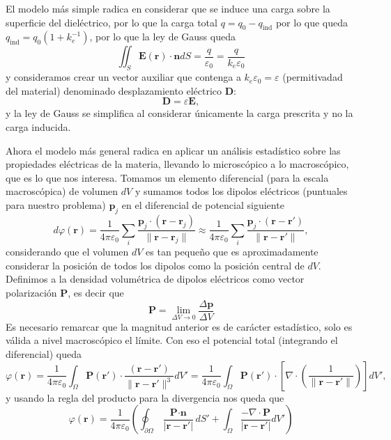 \documentclass[11pt,a4paper]{article}
\numberwithin{equation}{section}
\begin{document}
El modelo más simple radica en considerar que se induce una carga sobre la superficie del dieléctrico, por lo que la carga total $q = q_0 - q_{\text{ind}}$ por lo que queda $q_{\text{ind}} = q_0 (1 + k_{e}^{-1})$, por lo que la ley de Gauss queda \[\iint_{S} \textbf{E}(\textbf{r}) \cdot \textbf{n} dS = \frac{q}{\varepsilon_0} = \frac{q}{k_e \varepsilon_0}\] y consideramos crear un vector auxiliar que contenga a $k_e \varepsilon_0 = \varepsilon$ (permitivadad del material) denominado desplazamiento eléctrico $\textbf{D}$:
\begin{equation}
    \textbf{D} = \varepsilon \textbf{E},
    \label{eq:e_desplazamiento_simple}
\end{equation}
y la ley de Gauss se simplifica al considerar únicamente la carga prescrita y no la carga inducida.

Ahora el modelo más general radica en aplicar un análisis estadístico sobre las propiedades eléctricas de la materia, llevando lo microscópico a lo macroscópico, que es lo que nos interesa. Tomamos un elemento diferencial (para la escala macroscópica) de volumen $dV$ y sumamos todos los dipolos eléctricos (puntuales para nuestro problema) $\textbf{p}_j$ en el diferencial de potencial siguiente \[d\varphi(\textbf{r}) = \frac{1}{4\pi\varepsilon_0}\sum_i \frac{\textbf{p}_j \cdot (\textbf{r} - \textbf{r}_j)}{\|\textbf{r} - \textbf{r}_j\|} \approx \frac{1}{4\pi\varepsilon_0}\sum_i \frac{\textbf{p}_j \cdot (\textbf{r} - \textbf{r}')}{\|\textbf{r} - \textbf{r}'\|},\] considerando que el volumen $dV$ es tan pequeño que es aproximadamente considerar la posición de todos los dipolos como la posición central de $dV$. Definimos a la densidad volumétrica de dipolos eléctricos como vector polarización $\textbf{P}$, es decir que
\begin{equation}
    \textbf{P} = \lim_{\Delta V \to 0}\frac{\Delta \textbf{p}}{\Delta V}
    \label{eq:e_polarizacion}
\end{equation}
Es necesario remarcar que la magnitud anterior es de carácter estadístico, solo es válida a nivel macroscópico el límite. Con eso el potencial total (integrando el diferencial) queda \[\varphi(\textbf{r}) = \frac{1}{4\pi\varepsilon_0}\int_{\Omega} \textbf{P}(\textbf{r}') \cdot \frac{(\textbf{r} - \textbf{r}')}{\|\textbf{r} - \textbf{r}'\|^3} dV' = \frac{1}{4\pi\varepsilon_0}\int_{\Omega} \textbf{P}(\textbf{r}') \cdot \left[\nabla \cdot \left(\frac{1}{\|\textbf{r} - \textbf{r}'\|}\right)\right] dV',\] y usando la regla del producto para la divergencia nos queda que 
\begin{equation}
    \varphi(\textbf{r}) = \frac{1}{4\pi\varepsilon_0} (\oint_{\partial \Omega} \frac{\textbf{P} \cdot \textbf{n}}{|\textbf{r}-\textbf{r}'|} dS' + \int_{\Omega} \frac{-\nabla \cdot \textbf{P}}{|\textbf{r}-\textbf{r}'|} dV')
\end{equation}
\end{document}
